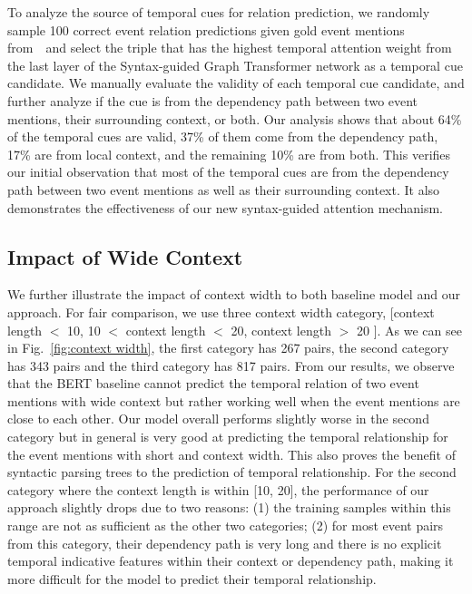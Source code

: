 To analyze the source of temporal cues for relation prediction, we randomly sample 100 correct event relation predictions given gold event mentions from~\matres~and select the triple that has the highest temporal attention weight from the last layer of the Syntax-guided Graph Transformer network as a temporal cue candidate. We manually evaluate the validity of each temporal cue candidate, and further analyze if the cue is from the dependency path between two event mentions, their surrounding context, or both. Our analysis shows that about 64\% of the temporal cues are valid, 37\% of them come from the dependency path, 17\% are from local context, and the remaining 10\% are from both. This verifies our initial observation that most of the temporal cues are from the dependency path between two event mentions as well as their surrounding context. It also demonstrates the effectiveness of our new syntax-guided attention mechanism. 











\subsection{Impact of Wide Context}




We further illustrate the impact of context width to both baseline model and our approach. For fair comparison, we use three context width category, [context length $<$ 10, 10 $<$ context length $<$ 20, context length $>$ 20 ]. As we can see in Fig.~\ref{fig:context width}, the first category has 267 pairs, the second category has 343 pairs and the third category has 817 pairs. From our results, we observe that the BERT baseline cannot predict the temporal relation of two event mentions with wide context but rather working well when the event mentions are close to each other. Our model overall performs slightly worse in the second category but in general is very good at predicting the temporal relationship for the event mentions with short and context width. This also proves the benefit of syntactic parsing trees to the prediction of temporal relationship. For the second category where the context length is within [10, 20], the performance of our approach slightly drops due to two reasons: (1) the training samples within this range are not as sufficient as the other two categories; (2) for most event pairs from this category, their dependency path is very
long and there is no explicit temporal indicative features within their context or dependency path, making it more difficult for the model to predict their temporal relationship.

